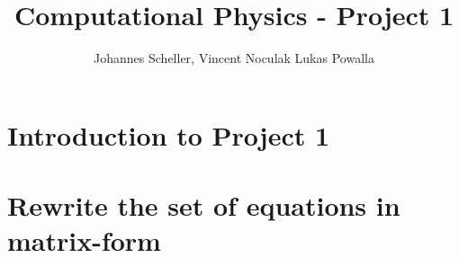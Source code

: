 \documentclass[10pt,a4paper]{article}
\author{Johannes Scheller, Vincent Noculak Lukas Powalla}
\title{Computational Physics - Project 1}
\begin{document}
\maketitle
\newpage
\tableofcontents
\newpage
\section{Introduction to Project 1}


\section{Rewrite the set of equations in matrix-form}
\end{document}
